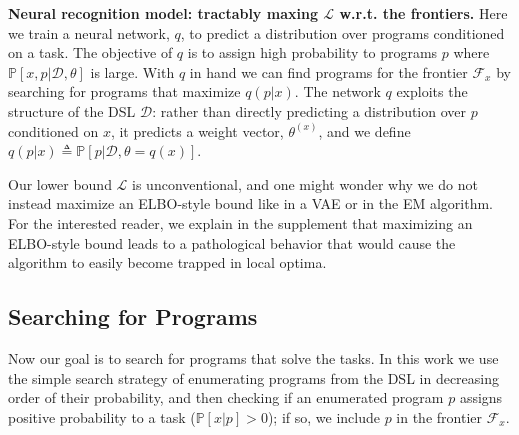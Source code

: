\documentclass{article}
\newcommand{\lowerBound}{\mathscr{L}}
\newcommand{\probability}{\mathds{P}} %
\begin{document}
\textbf{Neural recognition model: tractably maxing $\lowerBound$ w.r.t. the
  frontiers.}  Here we train a neural network, $q$, to predict a
distribution over programs conditioned on a task. The objective of $q$
is to assign high probability to programs $p$ where
$\probability[x,p|\mathcal{D},\theta]$ is large.  With $q$ in hand we can find programs for
the frontier $\mathcal{F}_x$ by searching for programs that maximize
$q(p|x)$.
The network $q$ exploits the structure of the DSL $\mathcal{D}$:
rather than directly predicting a distribution over $p$ conditioned on $x$,
it predicts a weight vector, $\theta^{(x)}$, and we define $q(p|x)\triangleq \probability[p|\mathcal{D},\theta = q(x)]$.

Our lower bound $\lowerBound$ is unconventional,
and one might wonder why we do not instead maximize an ELBO-style bound like in a VAE or in the EM algorithm.
For the interested reader, we explain in the supplement that maximizing an ELBO-style bound
leads to a pathological behavior that would cause the algorithm to easily become trapped in local optima.





\subsection{Searching for Programs}\label{explorationSection}

Now our goal is to search for programs that solve the tasks.  In this
work we use the simple search strategy of enumerating programs from
the DSL  in decreasing order of their probability,
and then checking if an enumerated program $p$ assigns positive
probability to a task ($\probability[x|p] > 0$); if so, we include $p$ in
the frontier $\mathcal{F}_x$.
\end{document}
